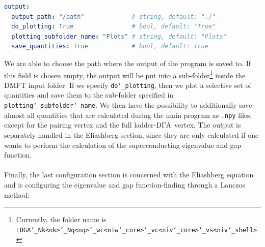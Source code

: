 \documentclass[../../main.tex]{subfiles}
\begin{document}
\begin{minipage}{\textwidth}%
\begin{lstlisting}[language=yaml]
output:
  output_path: "/path"             # string, default: "./"
  do_plotting: True                # bool, default: "True"
  plotting_subfolder_name: "Plots" # string, default: "Plots"
  save_quantities: True            # bool, default: True
\end{lstlisting}
\end{minipage}
We are able to choose the path where the output of the program is saved to. If this field is chosen empty, the output will be put into a sub-folder\footnote{Currently, the folder name is \texttt{LDGA\char`_Nk<nk>\char`_Nq<nq>\char`_wc<niw\char`_core>\char`_vc<niv\char`_core>\char`_vs<niv\char`_shell>}.} inside the DMFT input folder. If we specify \texttt{do\char`_plotting}, then we plot a selective set of quantities and save them to the sub-folder specified in \texttt{plotting\char`_subfolder\char`_name}. We then have the possibility to additionally save almost all quantities that are calculated during the main program as \texttt{.npy} files, except for the pairing vertex and the full ladder-$\text{D}\Gamma\text{A}$ vertex. The output is separately handled in the Eliashberg section, since they are only calculated if one wants to perform the calculation of the superconducting eigenvalue and gap function.
\\\\
Finally, the last configuration section is concerned with the Eliashberg equation and is configuring the eigenvalue and gap function-finding through a Lanczos method:
\end{document}
